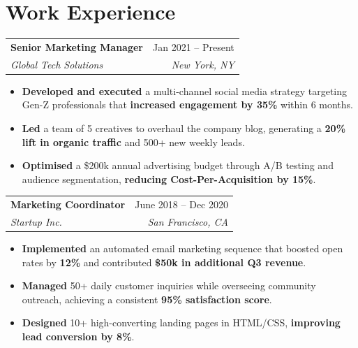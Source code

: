 \documentclass[10pt, letterpaper]{article}
\makeatletter
\newcommand{\experienceItem}[4]{%
  \vspace{4pt}%
  \noindent
  \begin{tabularx}{\linewidth}{@{} X r @{}}
    \textbf{\color{cvblack}#1} & \textcolor{cvgray}{#2} \\
    \textit{\color{cvgray}#3}  & \textit{\textcolor{cvgray}{#4}}
  \end{tabularx}%
  \vspace{2pt}%
}
\makeatother
\begin{document}
%
%

\section{Work Experience}

\experienceItem%
  {Senior Marketing Manager}   %
  {Jan 2021 -- Present}        %
  {Global Tech Solutions}      %
  {New York, NY}               %

\begin{itemize}
  \item \textbf{Developed and executed} a multi-channel social media strategy targeting Gen-Z professionals that \textbf{increased engagement by 35\%} within 6 months.
  \item \textbf{Led} a team of 5 creatives to overhaul the company blog, generating a \textbf{20\% lift in organic traffic} and 500+ new weekly leads.
  \item \textbf{Optimised} a \$200k annual advertising budget through A/B testing and audience segmentation, \textbf{reducing Cost-Per-Acquisition by 15\%}.
\end{itemize}

\experienceItem%
  {Marketing Coordinator}
  {June 2018 -- Dec 2020}
  {Startup Inc.}
  {San Francisco, CA}

\begin{itemize}
  \item \textbf{Implemented} an automated email marketing sequence that boosted open rates by \textbf{12\%} and contributed \textbf{\$50k in additional Q3 revenue}.
  \item \textbf{Managed} 50+ daily customer inquiries while overseeing community outreach, achieving a consistent \textbf{95\% satisfaction score}.
  \item \textbf{Designed} 10+ high-converting landing pages in HTML/CSS, \textbf{improving lead conversion by 8\%}.
\end{itemize}
\end{document}

